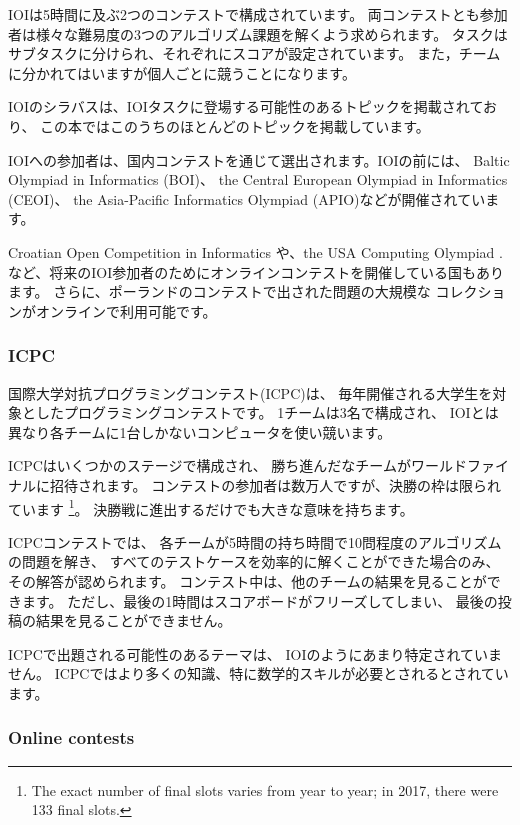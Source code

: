 IOIは5時間に及ぶ2つのコンテストで構成されています。
両コンテストとも参加者は様々な難易度の3つのアルゴリズム課題を解くよう求められます。
タスクはサブタスクに分けられ、それぞれにスコアが設定されています。
また，チームに分かれてはいますが個人ごとに競うことになります。


IOIのシラバス\cite{iois}は、IOIタスクに登場する可能性のあるトピックを掲載されており、
この本ではこのうちのほとんどのトピックを掲載しています。

IOIへの参加者は、国内コンテストを通じて選出されます。IOIの前には、
 Baltic Olympiad in Informatics (BOI)、
 the Central European Olympiad in Informatics (CEOI)、
 the Asia-Pacific Informatics Olympiad (APIO)などが開催されています。

 Croatian Open Competition in Informatics \cite{coci}
や、the USA Computing Olympiad \cite{usaco}.
など、将来のIOI参加者のためにオンラインコンテストを開催している国もあります。
さらに、ポーランドのコンテストで出された問題の大規模な
コレクションがオンラインで利用可能です\cite{main}。

\subsubsection{ICPC}

国際大学対抗プログラミングコンテスト(ICPC)は、
毎年開催される大学生を対象としたプログラミングコンテストです。
1チームは3名で構成され、
IOIとは異なり各チームに1台しかないコンピュータを使い競います。

ICPCはいくつかのステージで構成され、
勝ち進んだなチームがワールドファイナルに招待されます。
コンテストの参加者は数万人ですが、決勝の枠は限られています
\footnote{The exact number of final
slots varies from year to year; in 2017, there were 133 final slots.}。
決勝戦に進出するだけでも大きな意味を持ちます。

ICPCコンテストでは、
各チームが5時間の持ち時間で10問程度のアルゴリズムの問題を解き、
すべてのテストケースを効率的に解くことができた場合のみ、その解答が認められます。
コンテスト中は、他のチームの結果を見ることができます。
ただし、最後の1時間はスコアボードがフリーズしてしまい、 最後の投稿の結果を見ることができません。

ICPCで出題される可能性のあるテーマは、
IOIのようにあまり特定されていません。
ICPCではより多くの知識、特に数学的スキルが必要とされるとされています。

\subsubsection{Online contests}

